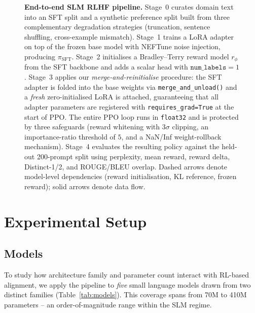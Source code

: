 \documentclass[10pt,twocolumn,letterpaper]{article}
\begin{document}
\begin{figure}[t]
{\begin{tikzpicture}[node distance=4mm, >=Stealth]
\end{tikzpicture}%
}
\caption{\textbf{End-to-end SLM RLHF pipeline.} Stage~0 curates domain text into an SFT split and a synthetic preference split built from three complementary degradation strategies (truncation, sentence shuffling, cross-example mismatch). Stage~1 trains a LoRA adapter on top of the frozen base model with NEFTune noise injection, producing $\pi_{\text{SFT}}$. Stage~2 initialises a Bradley--Terry reward model $r_\phi$ from the SFT backbone and adds a scalar head with $\texttt{num\_labels}=1$. Stage~3 applies our \emph{merge-and-reinitialise} procedure: the SFT adapter is folded into the base weights via \texttt{merge\_and\_unload()} and a \emph{fresh} zero-initialised LoRA is attached, guaranteeing that all adapter parameters are registered with \texttt{requires\_grad=True} at the start of PPO. The entire PPO loop runs in \texttt{float32} and is protected by three safeguards (reward whitening with $3\sigma$ clipping, an importance-ratio threshold of $5$, and a NaN/Inf weight-rollback mechanism). Stage~4 evaluates the resulting policy against the held-out 200-prompt split using perplexity, mean reward, reward delta, Distinct-1/2, and ROUGE/BLEU overlap. Dashed arrows denote model-level dependencies (reward initialisation, KL reference, frozen reward); solid arrows denote data flow.}
\label{fig:pipeline}
\end{figure}

\section{Experimental Setup}
\label{sec:setup}

\subsection{Models}
\label{sec:models}

To study how architecture family and parameter count interact with RL-based alignment, we apply the pipeline to \emph{five} small language models drawn from two distinct families (Table~\ref{tab:models}). This coverage spans from 70M to 410M parameters -- an order-of-magnitude range within the SLM regime.
\end{document}
